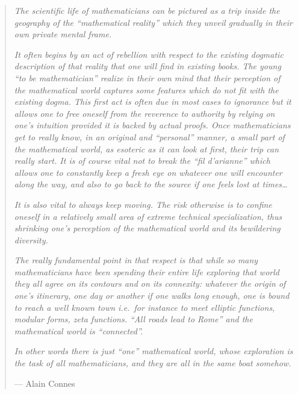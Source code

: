 \documentclass{article}
\begin{document}
\begin{quote}
\emph{The scientific life of mathematicians can be pictured as a trip
inside the geography of the ``mathematical reality'' which they unveil
gradually in their own private mental frame.}

\emph{It often begins by an act of rebellion with respect to the
existing dogmatic description of that reality that one will find in
existing books. The young ``to be mathematician'' realize in their own
mind that their perception of the mathematical world captures some
features which do not fit with the existing dogma. This first act is
often due in most cases to ignorance but it allows one to free oneself
from the reverence to authority by relying on one's intuition provided
it is backed by actual proofs. Once mathematicians get to really know,
in an original and ``personal'' manner, a small part of the mathematical
world, as esoteric as it can look at first, their trip can really start.
It is of course vital not to break the ``fil d'arianne'' which allows
one to constantly keep a fresh eye on whatever one will encounter along
the way, and also to go back to the source if one feels lost at
times\ldots{}}

\emph{It is also vital to always keep moving. The risk otherwise is to
confine oneself in a relatively small area of extreme technical
specialization, thus shrinking one's perception of the mathematical
world and its bewildering diversity.}

\emph{The really fundamental point in that respect is that while so many
mathematicians have been spending their entire life exploring that world
they all agree on its contours and on its connexity: whatever the origin
of one's itinerary, one day or another if one walks long enough, one is
bound to reach a well known town i.e.~for instance to meet elliptic
functions, modular forms, zeta functions. ``All roads lead to Rome'' and
the mathematical world is ``connected''.}

\emph{In other words there is just ``one'' mathematical world, whose
exploration is the task of all mathematicians, and they are all in the
same boat somehow.}

--- Alain Connes
\end{quote}
\end{document}
